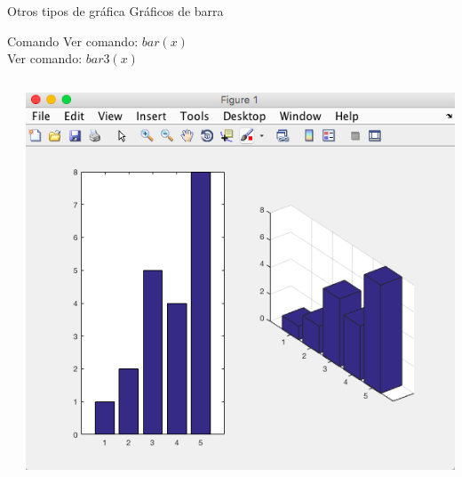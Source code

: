 \documentclass{bredelebeamer}
\begin{document}
\begin{frame}{Otros tipos de gráfica}
Gráficos de barra
\begin{exampleblock}{Comando}
Ver comando: \textbf{$bar(x)$}\\
Ver comando: \textbf{$bar3(x)$}\\
\end{exampleblock}
\begin{columns}
\begin{column}{0.5\textwidth}
\begin{center}
\end{center}
\end{column}
\begin{column}{0.5\textwidth}
\begin{center}
\includegraphics[scale=0.2]{images/pantalla24.png}
\end{center}
\end{column}
\end{columns}
\end{frame}
\end{document}
